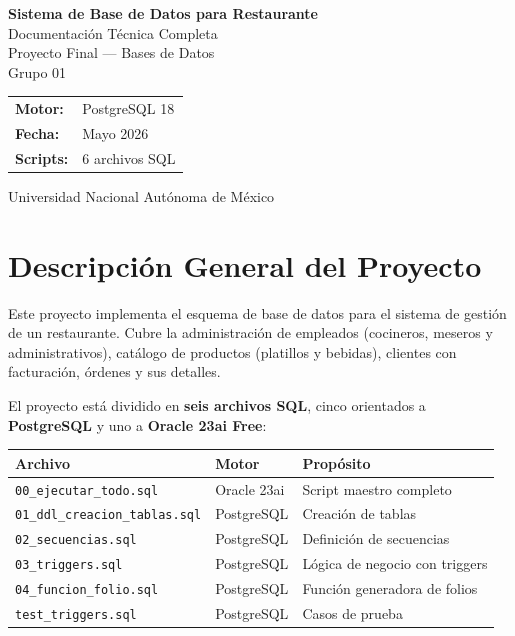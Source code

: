 \documentclass[12pt, a4paper]{article}
\begin{document}
\begin{titlepage}
    \centering
    \vspace*{2cm}
    {\LARGE \textbf{Sistema de Base de Datos para Restaurante}}\\[0.5cm]
    {\large Documentaci\'on T\'ecnica Completa}\\[2cm]
    {\large Proyecto Final --- Bases de Datos}\\[0.3cm]
    {\large Grupo 01}\\[3cm]
    \begin{tabular}{ll}
        \textbf{Motor:}   & PostgreSQL 18          \\[0.3cm]
        \textbf{Fecha:}   & Mayo 2026              \\[0.3cm]
        \textbf{Scripts:} & 6 archivos SQL         \\
    \end{tabular}
    \vfill
    {\small Universidad Nacional Aut\'onoma de M\'exico}
\end{titlepage}

\tableofcontents
\newpage

\section{Descripci\'on General del Proyecto}

Este proyecto implementa el esquema de base de datos para el sistema de gesti\'on de un restaurante. Cubre la administraci\'on de empleados (cocineros, meseros y administrativos), cat\'alogo de productos (platillos y bebidas), clientes con facturaci\'on, \'ordenes y sus detalles.

El proyecto est\'a dividido en \textbf{seis archivos SQL}, cinco orientados a \textbf{PostgreSQL} y uno a \textbf{Oracle 23ai Free}:

\begin{center}
\begin{tabularx}{\textwidth}{llX}
    \toprule
    \textbf{Archivo} & \textbf{Motor} & \textbf{Prop\'osito} \\
    \midrule
    \texttt{00\_ejecutar\_todo.sql}        & Oracle 23ai & Script maestro completo \\
    \texttt{01\_ddl\_creacion\_tablas.sql} & PostgreSQL  & Creaci\'on de tablas \\
    \texttt{02\_secuencias.sql}            & PostgreSQL  & Definici\'on de secuencias \\
    \texttt{03\_triggers.sql}              & PostgreSQL  & L\'ogica de negocio con triggers \\
    \texttt{04\_funcion\_folio.sql}        & PostgreSQL  & Funci\'on generadora de folios \\
    \texttt{test\_triggers.sql}            & PostgreSQL  & Casos de prueba \\
    \bottomrule
\end{tabularx}
\end{center}
\end{document}
